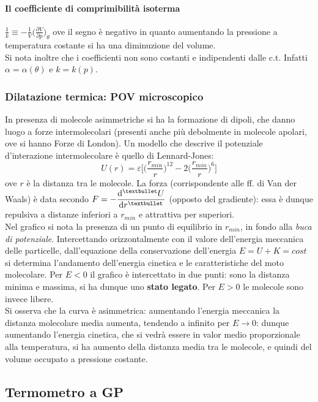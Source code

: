 \documentclass[10pt, oneside]{book}
\begin{document}
\paragraph{Il coefficiente di comprimibilità isoterma} $\displaystyle \frac{1}{k} \equiv - \frac{1}{V} \bigg(\frac{\partial V}{\partial p}\bigg)_\theta$ ove il segno è negativo in quanto aumentando la pressione a temperatura costante si ha una diminuzione del volume.
\\Si nota inoltre che i coefficienti non sono costanti e indipendenti dalle c.t. Infatti $\alpha = \alpha(\theta)$ e $k = k(p)$.
\subsubsection*{Dilatazione termica: POV microscopico}
In presenza di molecole asimmetriche si ha la formazione di dipoli, che danno luogo a forze intermolecolari (presenti anche più debolmente in molecole apolari, ove si hanno Forze di London). Un modello che descrive il potenziale d'interazione intermolecolare è quello di Lennard-Jones:
\[U(r) = \varepsilon \bigg[\bigg(\frac{r_{min}}{r}\bigg)^{12} - 2 \bigg(\frac{r_{min}}{r}\bigg)^6\bigg]\]
ove $r$ è la distanza tra le molecole. La forza (corrispondente alle ff. di Van der Waals) è data secondo $\displaystyle F = - \dv[•]{U}{r}$ (opposto del gradiente): essa è dunque repulsiva a distanze inferiori a $r_{min}$ e attrattiva per superiori.
\\Nel grafico si nota la presenza di un punto di equilibrio in $r_{min}$, in fondo alla \textit{buca di potenziale}. Intercettando orizzontalmente con il valore dell'energia meccanica delle particelle, dall'equazione della conservazione dell'energia $E = U + K = cost$ si determina l'andamento dell'energia cinetica e le caratteristiche del moto molecolare. Per $E < 0$ il grafico è intercettato in due punti: sono la distanza minima e massima, si ha dunque uno \textbf{stato legato}. Per $E > 0$ le molecole sono invece libere.
\\Si osserva che la curva è asimmetrica: aumentando l'energia meccanica la distanza molecolare media aumenta, tendendo a infinito per $E \rightarrow 0$: dunque aumentando l'energia cinetica, che si vedrà essere in valor medio proporzionale alla temperatura, si ha aumento della distanza media tra le molecole, e quindi del volume occupato a pressione costante.

\subsection{Termometro a GP}
\end{document}
